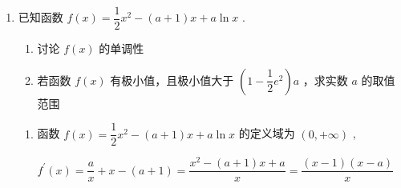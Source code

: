 \begin{enumerate}
\begin{enumerate}
\begin{jieda}
\begin{enumerate}
                所以 $\exists {x}_{0} \in  \left( {0,1}\right)$ ,使得 ${f}^{\prime }\left( {x}_{0}\right)  = 0,{x}_{0}$ 两侧的导数异号,
                
                所以 $2{x}_{0} - \dfrac{k}{{x}_{0} + 1} = 0$ ,即 $k = 2{x}_{0}^{2} + 2{x}_{0},{x}_{0} \in  \left( {0,1}\right)$ ,
                
                令 $g\left( {x}_{0}\right)  = 2{x}_{0}^{2} + 2{x}_{0},{x}_{0} \in  \left( {0,1}\right)$ ,
                
                由二次函数的性质知,对称轴为 ${x}_{0} =  - \dfrac{1}{2}$ ,开口向上,
                
                所以 $g\left( {x}_{0}\right)$ 在 $\left( {0,1}\right)$ 上单调递增,
                
                所以 $g\left( 0\right)  < g\left( {x}_{0}\right)  < g\left( 1\right)$ ,即 $0 < g\left( {x}_{0}\right)  < 4$ ,
                
                所以实数 $k$ 的取值范围为 $\left( {0,4}\right)$ .
            \end{enumerate}
        \end{jieda}
        
        \item 已知函数 $f\left( x\right)  = \dfrac{1}{2}{x}^{2} - \left( {a + 1}\right) x + a\ln x$ .
        \begin{enumerate}
            \item 讨论 $f\left( x\right)$ 的单调性
            \item 若函数 $f\left( x\right)$ 有极小值，且极小值大于 $\left( {1 - \dfrac{1}{2}{{e}}^{2}}\right) a$ ，求实数 $a$ 的取值范围
        \end{enumerate}
        \begin{jieda}
            \begin{enumerate}
                \item 函数 $f\left( x\right)  = \dfrac{1}{2}{x}^{2} - \left( {a + 1}\right) x + a\ln x$ 的定义域为 $\left( {0, + \infty }\right)$ ,
                
                ${f}^{\prime }\left( x\right)  = \dfrac{a}{x} + x - \left( {a + 1}\right)  = \dfrac{{x}^{2} - \left( {a + 1}\right) x + a}{x} = \dfrac{\left( {x - 1}\right) \left( {x - a}\right) }{x}$

\end{enumerate}
\end{jieda}
\end{enumerate}
\end{enumerate}
